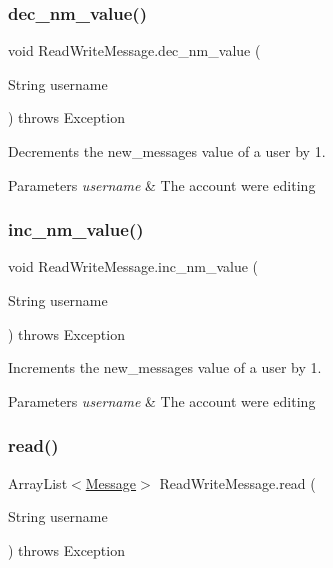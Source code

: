 \subsubsection{\texorpdfstring{dec\+\_\+nm\+\_\+value()}{dec\_nm\_value()}}
{\footnotesize\ttfamily void Read\+Write\+Message.\+dec\+\_\+nm\+\_\+value (\begin{DoxyParamCaption}\item[{String}]{username }\end{DoxyParamCaption}) throws Exception}



Decrements the new\+\_\+messages value of a user by 1. 


\begin{DoxyParams}{Parameters}
{\em username} & The account we\textquotesingle{}re editing \\
\hline
\end{DoxyParams}
\mbox{\label{class_read_write_message_ab95207fb27ef92136d39b454e7826fc5}} 
\subsubsection{\texorpdfstring{inc\+\_\+nm\+\_\+value()}{inc\_nm\_value()}}
{\footnotesize\ttfamily void Read\+Write\+Message.\+inc\+\_\+nm\+\_\+value (\begin{DoxyParamCaption}\item[{String}]{username }\end{DoxyParamCaption}) throws Exception}



Increments the new\+\_\+messages value of a user by 1. 


\begin{DoxyParams}{Parameters}
{\em username} & The account we\textquotesingle{}re editing \\
\hline
\end{DoxyParams}
\mbox{\label{class_read_write_message_a134117f3846976650506f858cd049059}} 
\subsubsection{\texorpdfstring{read()}{read()}}
{\footnotesize\ttfamily Array\+List$<$\hyperlink{class_message}{Message}$>$ Read\+Write\+Message.\+read (\begin{DoxyParamCaption}\item[{String}]{username }\end{DoxyParamCaption}) throws Exception}



